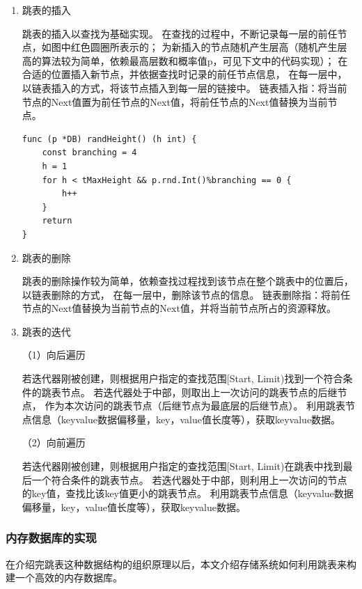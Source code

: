 \begin{enumerate}
		\item 跳表的插入
		
		跳表的插入以查找为基础实现。
		在查找的过程中，不断记录每一层的前任节点，如图中红色圆圈所表示的；
		为新插入的节点随机产生层高（随机产生层高的算法较为简单，依赖最高层数和概率值p，可见下文中的代码实现）；
		在合适的位置插入新节点，并依据查找时记录的前任节点信息，
		在每一层中，以链表插入的方式，将该节点插入到每一层的链接中。
		链表插入指：将当前节点的Next值置为前任节点的Next值，将前任节点的Next值替换为当前节点。

		\begin{lstlisting}[caption=skiplistRandHeight , label=code_radds_storage_skiplist_randHeight]
func (p *DB) randHeight() (h int) {
	const branching = 4
	h = 1
	for h < tMaxHeight && p.rnd.Int()%branching == 0 {
		h++
	}
	return
}	
		\end{lstlisting}

		\item 跳表的删除

		跳表的删除操作较为简单，依赖查找过程找到该节点在整个跳表中的位置后，以链表删除的方式，
		在每一层中，删除该节点的信息。
		链表删除指：将前任节点的Next值替换为当前节点的Next值，并将当前节点所占的资源释放。

		\item 跳表的迭代
		
		（1）向后遍历

		若迭代器刚被创建，则根据用户指定的查找范围[Start, Limit)找到一个符合条件的跳表节点。
		若迭代器处于中部，则取出上一次访问的跳表节点的后继节点，
		作为本次访问的跳表节点（后继节点为最底层的后继节点）。
		利用跳表节点信息（keyvalue数据偏移量，key，value值长度等），获取keyvalue数据。
		
		（2）向前遍历

		若迭代器刚被创建，则根据用户指定的查找范围[Start, Limit)在跳表中找到最后一个符合条件的跳表节点。
		若迭代器处于中部，则利用上一次访问的节点的key值，查找比该key值更小的跳表节点。
		利用跳表节点信息（keyvalue数据偏移量，key，value值长度等），获取keyvalue数据。

	\end{enumerate}

		\subsubsection{内存数据库的实现}

		在介绍完跳表这种数据结构的组织原理以后，本文介绍存储系统如何利用跳表来构建一个高效的内存数据库。

